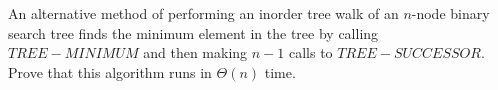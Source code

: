 \begin{homeworkProblem}
An alternative method of performing an inorder tree walk of an $n$-node binary
search tree finds the minimum element in the tree by calling $TREE-MINIMUM$ and
then making $n-1$ calls to $TREE-SUCCESSOR$. Prove that this algorithm runs in
$\Theta (n)$ time.

\segline

\solution


\end{homeworkProblem}
